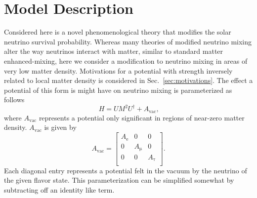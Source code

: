 \chapter{Model Description}
\label{sec:chameleons}

\ifpdf
    \graphicspath{{chameleons}{chameleons/figures/PDF/}{chameleons/figures/}}
\else
    \graphicspath{{chameleons/figures/EPS/}{chameleons/figures/}}
\fi

Considered here is a novel phenomenological theory that modifies the solar
neutrino survival probability.
Whereas many theories of modified neutrino mixing alter the way neutrinos
interact with matter, similar to standard matter enhanced-mixing,
here we consider a modification to neutrino mixing in areas of very low matter
density.
 Motivations for a potential with strength inversely related to local matter
density is considered in Sec.~\ref{sec:motivations}.
The effect a potential of this form is might have on neutrino
mixing is parameterized as follows
\begin{equation}
H = UM^{2}U^{\dagger} + A_{\mathrm{vac}}\text{,}
\end{equation}
where $A_{\mathrm{vac}}$ represents a potential only significant in regions
of near-zero matter density.
$A_{\mathrm{vac}}$ is given by
\begin{equation}
A_{\mathrm{vac}} =
\begin{bmatrix}
    A_{\mathrm{e}} & 0 & 0  \\
    0 &  A_{\mathrm{\mu}} & 0  \\
    0 & 0 &  A_{\mathrm{\tau}}  \\
\end{bmatrix}\text{.}
\end{equation}
Each diagonal entry represents a potential felt in the vacuum
by the neutrino of the given flavor state.
This parameterization can be simplified somewhat by subtracting off
an identity like term.
